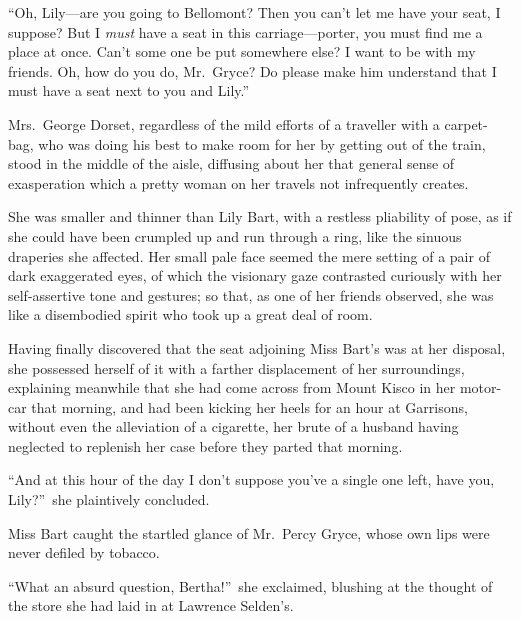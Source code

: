 \documentclass[12pt,a4paper]{book}
\begin{document}
``Oh, Lily---are you going to Bellomont? Then you can't let me have
your seat, I suppose? But I \textit{must} have a seat in this
carriage---porter, you must find me a place at once. Can't some
one be put somewhere else? I want to be with my friends. Oh, how
do you do, Mr.\ Gryce? Do please make him understand that I must
have a seat next to you and Lily.''





Mrs.\ George Dorset, regardless of the mild efforts of a traveller
with a carpet-bag, who was doing his best to make room for her by
getting out of the train, stood in the middle of the aisle,
diffusing about her that general sense of exasperation which a
pretty woman on her travels not infrequently creates.





She was smaller and thinner than Lily Bart, with a restless
pliability of pose, as if she could have been crumpled up and run
through a ring, like the sinuous draperies she affected. Her
small pale face seemed the mere setting of a pair of dark
exaggerated eyes, of which the visionary gaze contrasted
curiously with her self-assertive tone and gestures; so that, as
one of her friends observed, she was like a disembodied spirit
who took up a great deal of room.





Having finally discovered that the seat adjoining Miss Bart's was
at her disposal, she possessed herself of it with a farther
displacement of her surroundings, explaining meanwhile that she
had come across from Mount Kisco in her motor-car that morning,
and had been kicking her heels for an hour at Garrisons, without
even the alleviation of a cigarette, her brute of a
husband having neglected to replenish her case before they parted
that morning.





``And at this hour of the day I don't suppose you've a single one
left, have you, Lily?''\ she plaintively concluded.





Miss Bart caught the startled glance of Mr.\ Percy Gryce, whose
own lips were never defiled by tobacco.





``What an absurd question, Bertha!''\ she exclaimed, blushing at the
thought of the store she had laid in at Lawrence Selden's.
\end{document}

